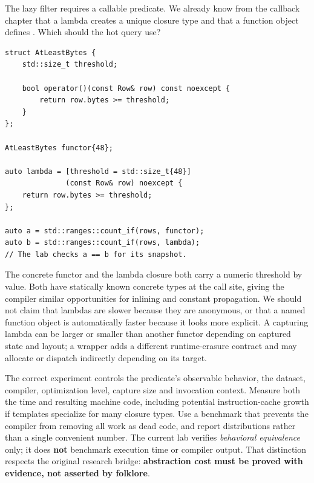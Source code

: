 \hypertarget{05-engine-i-ch006-a-function-object-or-lambda-is-not-necessarily-slow-its-representation-must-be-measured}{}

The lazy filter requires a callable predicate. We already know from the callback chapter that a lambda creates a unique closure type and that a function object defines . Which should the hot query use?

\begin{verbatim}
struct AtLeastBytes {
    std::size_t threshold;

    bool operator()(const Row& row) const noexcept {
        return row.bytes >= threshold;
    }
};

AtLeastBytes functor{48};

auto lambda = [threshold = std::size_t{48}]
              (const Row& row) noexcept {
    return row.bytes >= threshold;
};

auto a = std::ranges::count_if(rows, functor);
auto b = std::ranges::count_if(rows, lambda);
// The lab checks a == b for its snapshot.
\end{verbatim}

The concrete functor and the lambda closure both carry a numeric threshold by value. Both have statically known concrete types at the  call site, giving the compiler similar opportunities for inlining and constant propagation. We should not claim that lambdas are slower because they are anonymous, or that a named function object is automatically faster because it looks more explicit. A capturing lambda can be larger or smaller than another functor depending on captured state and layout; a  wrapper adds a different runtime-erasure contract and may allocate or dispatch indirectly depending on its target.

The correct experiment controls the predicate's observable behavior, the dataset, compiler, optimization level, capture size and invocation context. Measure both the time and resulting machine code, including potential instruction-cache growth if templates specialize for many closure types. Use a benchmark that prevents the compiler from removing all work as dead code, and report distributions rather than a single convenient number. The current lab verifies \emph{behavioral equivalence} only; it does \textbf{not} benchmark execution time or compiler output. That distinction respects the original research bridge: \textbf{abstraction cost must be proved with evidence, not asserted by folklore}.


